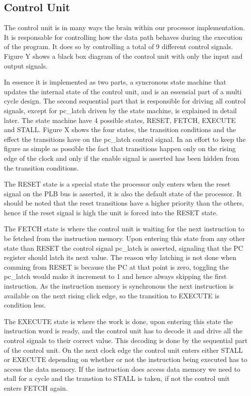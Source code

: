 \subsection*{Control Unit}

The control unit is in many ways the brain within our processor implementation. It is responsable for controlling how the data path behaves during the execution of the program. It does so by controlling a total of 9 different control signals. Figure Y shows a black box diagram of the control unit with only the input and output signals.

In essence it is implemented as two parts, a syncronous state machine that updates the internal state of the control unit, and is an essensial part of a multi cycle design. The second sequential part that is responsible for driving all control signals, except for pc_latch driven by the state machine, is explained in detail later. The state machine have 4 possible states, RESET, FETCH, EXECUTE and STALL. Figure X shows the four states, the transition conditions and the effect the transitions have on the pc_latch control signal. In an effort to keep the figure as simple as possible the fact that transitions happen only on the rising edge of the clock and only if the enable signal is asserted has been hidden from the transition conditions.

The RESET state is a special state the processor only enters when the reset signal on the PLB bus is asserted, it is also the default state of the processor. It should be noted that the reset transitions have a higher priority than the others, hence if the reset signal is high the unit is forced into the RESET state.

The FETCH state is where the control unit is waiting for the next instruction to be fetched from the instruction memory. Upon entering this state from any other state than RESET the control signal pc_latch is asserted, signaling that the PC register should latch its next value. The reason why latching is not done when comming from RESET is because the PC at that point is zero, toggling the pc_latch would make it increment to 1 and hence always skipping the first instruction. As the instruction memory is synchronous the next instruction is available on the next rising click edge, so the transition to EXECUTE is condition less.

The EXECUTE state is where the work is done, upon entering this state the instruction word is ready, and the control unit has to decode it and drive all the control signals to their correct value. This decoding is done by the sequential part of the control unit. On the next clock edge the control unit enters either STALL or EXECUTE depending on whether or not the instruction being executed has to access the data memory. If the instruction does access data memory we need to stall for a cycle and the transtion to STALL is taken, if not the control unit enters FETCH again.


